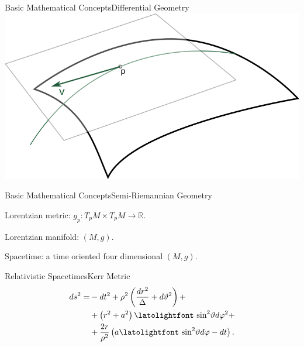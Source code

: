 \begin{frame}{Basic Mathematical Concepts}{Differential Geometry}
	\centering
	\includegraphics[height=0.4\paperwidth]{gfx/planotangente}
\end{frame}

\begin{frame}{Basic Mathematical Concepts}{Semi-Riemannian Geometry}
	\large
	\begin{fullpageitemize}
		\item Lorentzian metric: $g_p \colon T_pM\times T_pM \to \mathbb{R}$.
		\pause
		\item Lorentzian manifold: $(M,g)$.
		\pause
		\item Spacetime: a time oriented four dimensional $(M,g)$.
	\end{fullpageitemize}
\end{frame}




\begin{frame}{Relativistic Spacetimes}{Kerr Metric}
	{\Large
		\begin{align*}
		ds^2 = &-dt^2 + \rho^2\left(\frac{dr^2}{\Delta} + d\vartheta^2\right) + \\
		&+ \left(r^2 + a^2\right)\textrm{\latolightfont sin}^2\vartheta d\varphi^2 + \\
		\nonumber
		&+ \frac{2r}{\rho^2}\left(a\textrm{\latolightfont sin}^2\vartheta d\varphi - dt\right).
		\end{align*}
	}
\end{frame}




